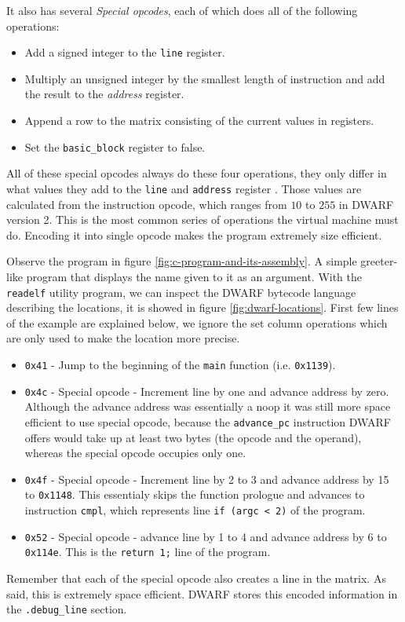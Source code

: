 It also has several \textit{Special opcodes}, each of which does all of the
following operations:
\begin{itemize}
    \item Add a signed integer to the \texttt{line} register.
    \item Multiply an unsigned integer by the smallest length of instruction
        and add the result to the \textit{address} register.
    \item Append a row to the matrix consisting of the current values in
        registers.
    \item Set the \texttt{basic\_block} register to false.
\end{itemize}
All of these special opcodes always do these four operations, they only differ
in what values they add to the \texttt{line} and \texttt{address} register
\cite{dwarf}. Those values are calculated from the instruction opcode, which
ranges from $10$ to $255$ in DWARF version 2. This is the most common series of
operations the virtual machine must do. Encoding it into single opcode makes
the program extremely size efficient.

Observe the program in figure \ref{fig:c-program-and-its-assembly}. A simple
greeter-like program that displays the name given to it as an argument. With
the \texttt{readelf} utility program, we can inspect the DWARF bytecode
language describing the locations, it is showed in figure
\ref{fig:dwarf-locations}. First few lines of the example are explained below,
we ignore the set column operations which are only used to make the location
more precise.
\begin{itemize}
    \item \texttt{0x41} - Jump to the beginning of the \texttt{main} function (i.e. \texttt{0x1139}).
    \item \texttt{0x4c} - Special opcode - Increment line by one and advance
        address by zero. Although the advance address was essentially a noop it
        was still more space efficient to use special opcode, because the
        \texttt{advance\_pc} instruction DWARF offers would take up at least
        two bytes (the opcode and the operand), whereas
        the special opcode occupies only one.
    \item \texttt{0x4f} - Special opcode - Increment line by 2 to 3 and advance address by 15 to \texttt{0x1148}.
        This essentialy skips the function prologue and advances to instruction \texttt{cmpl}, which represents
        line \texttt{if (argc < 2)} of the program.
    \item \texttt{0x52} - Special opcode - advance line by 1 to 4 and advance address by 6 to \texttt{0x114e}.
        This is the \texttt{return 1;} line of the program.
\end{itemize}
Remember that each of the special opcode also creates a line in the matrix. As
said, this is extremely space efficient. DWARF stores this encoded information
in the \verb|.debug_line| section.

